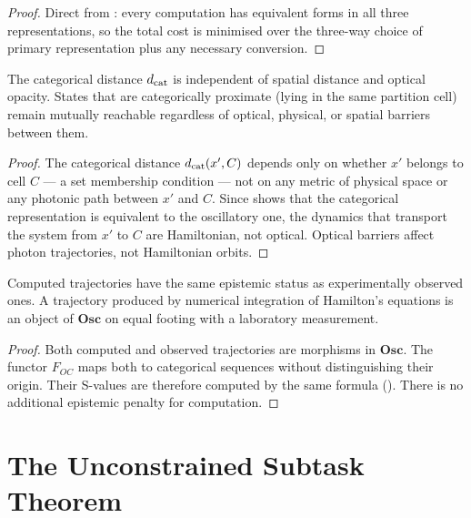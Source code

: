 \begin{proof}
Direct from : every computation has equivalent
forms in all three representations, so the total cost is minimised over
the three-way choice of primary representation plus any necessary conversion.
\end{proof}

\begin{corollary}
\label{cor:opacity-independence}
The categorical distance $d_{\mathrm{cat}}$ is independent of spatial distance and optical
opacity.  States that are categorically proximate (lying in the same partition
cell) remain mutually reachable regardless of optical, physical, or spatial
barriers between them.
\end{corollary}

\begin{proof}
The categorical distance $d_{\mathrm{cat}}(x', C)$ depends only on whether $x'$ belongs
to cell $C$ — a set membership condition — not on any metric of physical space
or any photonic path between $x'$ and $C$.  Since 
shows that the categorical representation is equivalent to the oscillatory one,
the dynamics that transport the system from $x'$ to $C$ are Hamiltonian, not
optical.  Optical barriers affect photon trajectories, not Hamiltonian orbits.
\end{proof}

\begin{corollary}
\label{cor:comp-obs-identity}
Computed trajectories have the same epistemic status as experimentally observed
ones.  A trajectory produced by numerical integration of Hamilton's equations
is an object of $\mathbf{Osc}$ on equal footing with a laboratory measurement.
\end{corollary}

\begin{proof}
Both computed and observed trajectories are morphisms in $\mathbf{Osc}$.
The functor $F_{OC}$ maps both to categorical sequences without distinguishing
their origin.  Their S-values are therefore computed by the same formula
().  There is no additional epistemic penalty for
computation.
\end{proof}

\section{The Unconstrained Subtask Theorem}
\label{sec:unconstrained-subtask}

